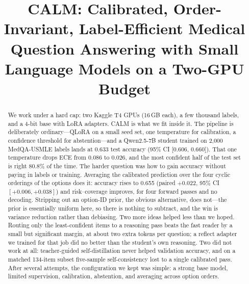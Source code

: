 \documentclass[conference]{IEEEtran}
\begin{document}
\title{CALM\@: Calibrated, Order-Invariant, Label-Efficient Medical Question Answering with Small Language Models on a Two-GPU Budget}

\author{
\and
{}
\and
{}
}

\maketitle

\begin{abstract}
We work under a hard cap: two Kaggle T4 GPUs (16\,GB each), a few thousand labels, and a 4-bit base with LoRA adapters. CALM is what we fit inside it. The pipeline is deliberately ordinary---QLoRA on a small seed set, one temperature for calibration, a confidence threshold for abstention---and a Qwen2.5-7B student trained on 2{,}000 MedQA-USMLE labels lands at 0.633 test accuracy (95\% CI [0.606, 0.660]). That one temperature drops ECE from 0.086 to 0.026, and the most confident half of the test set is right 80.8\% of the time. The harder question was how to gain accuracy without paying in labels or training. Averaging the calibrated prediction over the four cyclic orderings of the options does it: accuracy rises to 0.655 (paired $+0.022$, 95\% CI $[+0.006,+0.038]$) and risk--coverage improves, for four forward passes and no decoding. Stripping out an option-ID prior, the obvious alternative, does not---the prior is essentially uniform here, so there is nothing to subtract, and the win is variance reduction rather than debiasing. Two more ideas helped less than we hoped. Routing only the least-confident items to a reasoning pass beats the fast reader by a small but significant margin, at about two extra tokens per question; a reflect adapter we trained for that job did no better than the student's own reasoning. Two did not work at all: teacher-guided self-distillation never helped validation accuracy, and on a matched 134-item subset five-sample self-consistency lost to a single calibrated pass. After several attempts, the configuration we kept was simple: a strong base model, limited supervision, calibration, abstention, and averaging across option orders.
\end{abstract}
\end{document}
